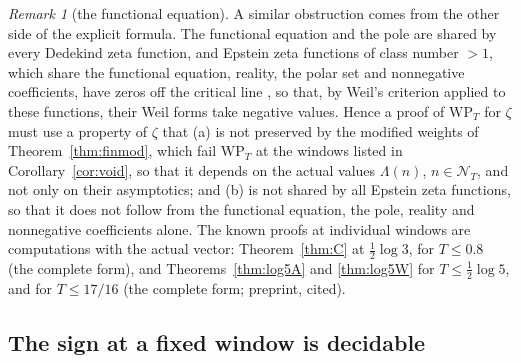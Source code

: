 \documentclass[11pt]{amsart}
\theoremstyle{definition}
\theoremstyle{remark}
\newtheorem{remark}[theorem]{Remark}
\newcommand{\NT}{\mathcal N_T}
\begin{document}
\begin{remark}[the functional equation]\label{rem:twohalves}
A similar obstruction comes from the other side of the explicit formula. The functional equation and the
pole are shared by every Dedekind zeta function, and Epstein zeta functions of class number $>1$, which
share the functional equation, reality, the polar set and nonnegative coefficients, have zeros off the
critical line \cite{DavenportHeilbronn1936}, so that, by Weil's criterion \cite{Weil52} applied to these
functions, their Weil forms take negative values. Hence a proof of $\mathrm{WP}_T$ for $\zeta$ must use a
property of $\zeta$ that (a) is not preserved by the modified weights of Theorem~\ref{thm:finmod}, which fail
$\mathrm{WP}_T$ at the windows listed in Corollary~\ref{cor:void}, so that it depends on the actual values
$\Lambda(n)$, $n\in\NT$, and not only on their asymptotics; and (b) is not shared by all Epstein zeta
functions, so that it does not follow from the functional equation, the pole, reality and nonnegative
coefficients alone. The known proofs at individual windows are computations with the actual vector:
Theorem~\ref{thm:C} at $\frac12\log3$, \cite[Thm.~1.2]{Zhu2026} for $T\le0.8$ (the complete form), and
Theorems~\ref{thm:log5A} and \ref{thm:log5W} for $T\le\frac12\log5$, and \cite[Thm.~B]{Liu2026} for
$T\le17/16$ (the complete form; preprint, cited).
\end{remark}



\subsection{The sign at a fixed window is decidable}
\end{document}
